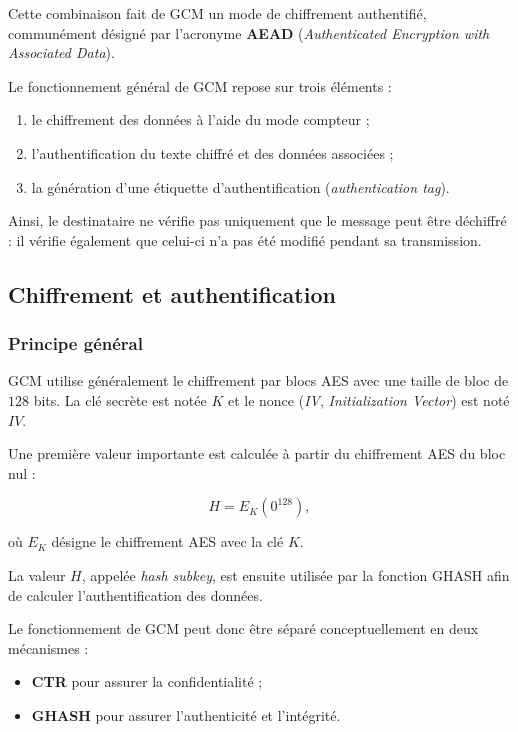 \documentclass[12pt,a4paper]{article}
\begin{document}
Cette combinaison fait de GCM un mode de chiffrement authentifié,
communément désigné par l'acronyme \textbf{AEAD}
(\textit{Authenticated Encryption with Associated Data}).

Le fonctionnement général de GCM repose sur trois éléments :

\begin{enumerate}
    \item le chiffrement des données à l'aide du mode compteur ;
    \item l'authentification du texte chiffré et des données associées ;
    \item la génération d'une étiquette d'authentification
    (\textit{authentication tag}).
\end{enumerate}

Ainsi, le destinataire ne vérifie pas uniquement que le message peut
être déchiffré : il vérifie également que celui-ci n'a pas été modifié
pendant sa transmission.

\subsection{Chiffrement et authentification}
\label{subsec:gcm_chiffrement_authentification}

\subsubsection{Principe général}

GCM utilise généralement le chiffrement par blocs AES avec une taille
de bloc de $128$ bits. La clé secrète est notée $K$ et le nonce
(\textit{IV}, \textit{Initialization Vector}) est noté $IV$.

Une première valeur importante est calculée à partir du chiffrement
AES du bloc nul :

\begin{equation}
H = E_K(0^{128}),
\label{eq:gcm_h}
\end{equation}

où $E_K$ désigne le chiffrement AES avec la clé $K$.

La valeur $H$, appelée \textit{hash subkey}, est ensuite utilisée par
la fonction GHASH afin de calculer l'authentification des données.

Le fonctionnement de GCM peut donc être séparé conceptuellement en
deux mécanismes :

\begin{itemize}
    \item \textbf{CTR} pour assurer la confidentialité ;
    \item \textbf{GHASH} pour assurer l'authenticité et l'intégrité.
\end{itemize}
\end{document}
